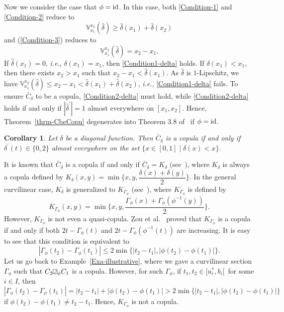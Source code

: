 \documentclass[12pt]{article}
\theoremstyle{plain}
\newtheorem{corl}[thrm]{Corollary}
\theoremstyle{definition}
\newcommand{\MySs}{
\begin{tikzpicture}[baseline]
\draw (0,0em) -- (0em,0.6em) -- (0.6em,0.6em) -- (0.6em,0em) -- (0,0em);
\draw (0,0em) parabola (0.6em, 0.6em);
\end{tikzpicture}}
\begin{document}
Now we consider the case that $\phi=\rm{id}$. In this case, both \eqref{Condition-1} and \eqref{Condition-2} reduce to
\begin{equation}\label{Condition1-delta}
\mathbb{V}_{x_1}^{x_2}(\hat{\delta})\geq \hat{\delta}(x_1)+\hat{\delta}(x_2)
\end{equation}
and (\ref{Condition-3}) reduces to
\begin{equation}\label{Condition2-delta}
\mathbb{V}_{x_1}^{x_2}(\hat{\delta})= x_2-x_1.
\end{equation}
If $\hat{\delta}(x_1)=0$, \emph{i.e.}, $\delta(x_1)=x_1$, then \eqref{Condition1-delta} holds. If $\delta(x_1)<x_1$, then there exists $x_2>x_1$ such that $x_2-x_1<\hat{\delta}(x_1)$. As $\hat{\delta}$ is $1$-Lipschitz, we have $\mathbb{V}_{x_1}^{x_2}(\hat{\delta})\leq x_2-x_1<\hat{\delta}(x_1)+\hat{\delta}(x_2)$, \emph{i.e.}, \eqref{Condition1-delta} fails. To ensure $\bar{C}_\delta$ to be a copula, \eqref{Condition2-delta} must hold, while \eqref{Condition2-delta} holds if and only if $|\hat{\delta}^\prime|=1$ almost everywhere on $[x_1, x_2]$. Hence, Theorem~\ref{thrm-CbeCopu} degenerates into Theorem 3.8 of~\cite{KMS24} if $\phi=\rm{id}$.
\begin{corl}
Let $\delta$ be a diagonal function. Then $\bar{C}_\delta$ is a copula if and only if $\delta^\prime(t)\in\{0, 2\}$ almost everywhere on the set $\{x\in[0, 1]\mid \delta(x)<x\}$.
\end{corl}

It is known that $\bar{C}_\delta$ is a copula if and only if $\bar{C}_\delta=K_\delta$ (see~\cite{NQRU08}), where $K_\delta$ is always a copula defined by $K_\delta(x, y)=\min\{x, y, \dfrac{\delta(x)+\delta(y)}{2}\}$. In the general curvilinear case, $K_\delta$ is generalized to $K_{\Gamma_\phi}$ (see~\cite{BMJ19}), where $K_{\Gamma_\phi}$ is defined by
\[
K_{\Gamma_\phi}(x, y)=\min\{x, y, \frac{\Gamma_\phi(x)+\Gamma_\phi(\phi^{-1}(y))}{2}\}.
\]
However, $K_{\Gamma_\phi}$ is not even a quasi-copula. Zou et al.~\cite{ZSX22} proved that $K_{\Gamma_\phi}$ is a copula if and only if both $2t-\Gamma_\phi(t)$ and $2t-\Gamma_\phi(\phi^{-1}(t))$ are increasing. It is easy to see that this condition is equivalent to
\begin{equation}\label{Condition-KisCopu}
|\Gamma_\phi(t_2)-\Gamma_\phi(t_1)|\leq 2\min\{|t_2-t_1|, |\phi(t_2)-\phi(t_1)|\}.
\end{equation}
Let us go back to Example~\ref{Exa-illustrative}, where we gave a curvilinear section $\Gamma_\phi$ such that $C_2\MySs_\phi C_1$ is a copula. However, for such $\Gamma_\phi$, if $t_1, t_2\in [u^*_i, b_i[\,$ for some $i\in I$, then
\[
|\Gamma_\phi(t_2)-\Gamma_\phi(t_1)|=|t_2-t_1|+|\phi(t_2)-\phi(t_1)|>2\min\{|t_2-t_1|, |\phi(t_2)-\phi(t_1)|\}
\]
if $\phi(t_2)-\phi(t_1)\neq t_2-t_1$. Hence, $K_{\Gamma_\phi}$ is not a copula.
\end{document}
